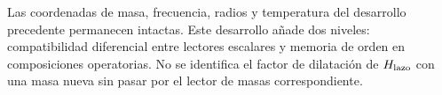 Las coordenadas de masa, frecuencia, radios y temperatura del
desarrollo precedente permanecen intactas. Este desarrollo añade
dos niveles: compatibilidad diferencial entre lectores escalares
y memoria de orden en composiciones operatorias.
No se identifica el factor de dilatación de \(H_{\rm lazo}\) con
una masa nueva sin pasar por el lector de masas correspondiente.
